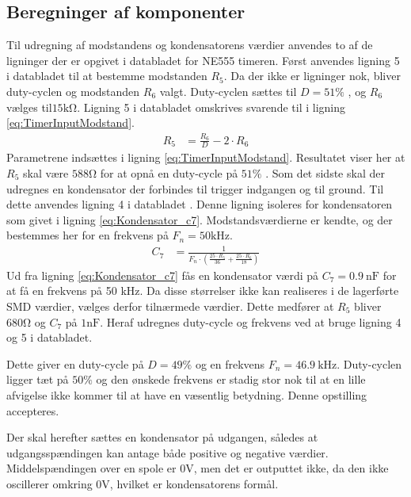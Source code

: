 \subsection{Beregninger af komponenter}
Til udregning af modstandens og kondensatorens værdier anvendes to af de ligninger der er opgivet i databladet for NE555 timeren. 
Først anvendes ligning 5 i databladet til at bestemme modstanden $R_5$. 
Da der ikke er ligninger nok, bliver duty-cyclen og modstanden $R_6$ valgt. 
Duty-cyclen sættes til $D = 51\%$  , og $R_6$ vælges til$ 15\si{\kilo\ohm}$. 
Ligning 5 \cite[Side 11.]{NE555} i databladet omskrives svarende til i ligning \ref{eq:TimerInputModstand}.
\begin{align}
R_5 & = \frac{R_6}{D} - 2 \cdot R_6 \label{eq:TimerInputModstand}
\end{align}
Parametrene indsættes i ligning \ref{eq:TimerInputModstand}.
Resultatet viser her at $R_5$ skal være $588\si{\ohm}$ for at opnå en duty-cycle på $51\%$ .
Som det sidste skal der udregnes en kondensator der forbindes til trigger indgangen og til ground. 
Til dette anvendes ligning 4 i databladet \cite[Side 11]{NE555}. Denne ligning isoleres for kondensatoren som givet i ligning \ref{eq:Kondensator_c7}.
Modstandsværdierne er kendte, og der bestemmes her for en frekvens på $F_n = 50 \si{\kilo\hertz}$.
\begin{align}
	C_7 & = \frac{1}{F_n \cdot \left( \frac{25 \cdot R_5 }{36} + \frac{25 \cdot R_6}{18} \right) \label{eq:Kondensator_c7}}
\end{align}
Ud fra ligning \ref{eq:Kondensator_c7} fås en kondensator værdi på $C_7 = \SI{0.9}{\nano\farad}$ for at få en frekvens på 50 \si{\kilo\hertz}. 
Da disse størrelser ikke kan realiseres i de lagerførte SMD værdier, vælges derfor tilnærmede værdier. 
Dette medfører at $R_5$ bliver $680\si{\ohm}$ og $C_7$ på $1\si{\nano\farad}$. 
Heraf udregnes duty-cycle og frekvens ved at bruge ligning 4 og 5 i databladet. \cite[Side 11.]{NE555}

Dette giver en duty-cycle på $D = 49\%$ og en frekvens $F_n = \SI{46.9}{\kilo\hertz}$. 
Duty-cyclen ligger tæt på $50\%$ og den ønskede frekvens er stadig stor nok til at en lille afvigelse ikke kommer til at have en væsentlig betydning. Denne opstilling accepteres.

Der skal herefter sættes en kondensator på udgangen, således at udgangsspændingen kan antage både positive og negative værdier. 
Middelspændingen over en spole er $0\si{\volt}$, men det er outputtet ikke, da den ikke oscillerer omkring $0 \si{\volt}$, hvilket er kondensatorens formål. 
